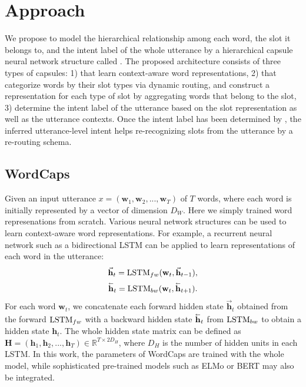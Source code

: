 \section{Approach}
We propose to model the hierarchical relationship among each word, the slot it belongs to, and the intent label of the whole utterance by a hierarchical capsule neural network structure called {\ModelName}. The proposed architecture consists of three types of capsules: 1) {\FirstCapsule} that learn context-aware word representations, 2) {\SecondCapsule} that categorize words by their slot types via dynamic routing, and construct a representation for each type of slot by aggregating words that belong to the slot, 3) {\ThirdCapsule} determine the intent label of the utterance based on the slot representation as well as the utterance contexts. Once the intent label has been determined by {\ThirdCapsule}, the inferred utterance-level intent helps re-recognizing slots from the utterance by a re-routing schema. 

\subsection{WordCaps}
Given an input utterance \(x = \left (  \mathbf{w}_{1}, \mathbf{w}_{2}, ..., \mathbf{w}_{T}\right )\) of $T$ words, where each word is initially represented by a vector of dimension $D_W$. Here we simply trained word represenations from scratch. Various neural network structures can be used to learn context-aware word representations. For example, a recurrent neural network such as a bidirectional LSTM \citep{hochreiter1997long} can be applied to learn representations of each word in the utterance:
\begin{equation}
\begin{gathered}
     \vec{\mathbf{h}}_{t} = {\rm LSTM}_{fw} (\mathbf{w}_{t}, \vec{\mathbf{h}}_{t-1}),\\
     {\mathord{\buildrel{\lower3pt\hbox{$\scriptscriptstyle\leftarrow$}}\over {\mathbf{h}}} }_{t} = {\rm LSTM}_{bw} (\mathbf{w}_{t}, {\mathord{\buildrel{\lower3pt\hbox{$\scriptscriptstyle\leftarrow$}}\over {\mathbf{h}}} }_{t+1}).\\
\end{gathered}
\end{equation}
For each word \(\mathbf{w}_t\), we concatenate each forward hidden state \(\vec{\mathbf{h}}_{t}\) obtained from the forward ${\rm LSTM}_{fw}$ with a backward hidden state \({\mathord{\buildrel{\lower3pt\hbox{$\scriptscriptstyle\leftarrow$}}\over 
{\mathbf{h}}} }_{t}\) from ${\rm LSTM}_{bw}$ to obtain a hidden state \(\mathbf{h}_t\). The whole hidden state matrix can be defined as \(\mathbf{H} = \left(\mathbf{h}_{1}, \mathbf{h}_{2}, ..., \mathbf{h}_{T}\right) \in \mathbb{R}^{T \times 2D_{H}}\), where $D_H$ is the number of hidden units in each LSTM. 
In this work, the parameters of WordCaps are trained with the whole model, while sophisticated pre-trained models such as ELMo \citep{peters2018deep} or BERT \citep{devlin2018bert} may also be integrated.
 
